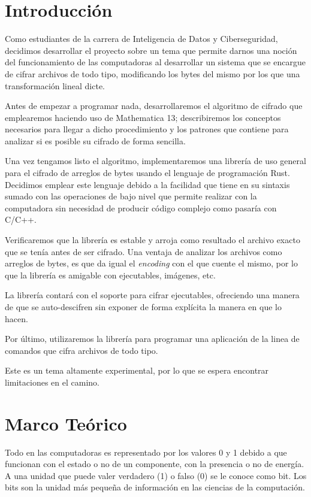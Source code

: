\documentclass[a4paper]{article}
\begin{document}
\newpage

\section{Introducción}

Como estudiantes de la carrera de Inteligencia de Datos y Ciberseguridad,
decidimos desarrollar el proyecto sobre un tema que permite darnos una noción
del funcionamiento de las computadoras al desarrollar un sistema que se
encargue de cifrar archivos de todo tipo, modificando los bytes del mismo por
los que una transformación lineal dicte.

Antes de empezar a programar nada, desarrollaremos el algoritmo de cifrado que
emplearemos haciendo uso de Mathematica 13; describiremos los conceptos
necesarios para llegar a dicho procedimiento y los patrones que contiene para
analizar si es posible su cifrado de forma sencilla.

Una vez tengamos listo el algoritmo, implementaremos una librería de uso
general para el cifrado de arreglos de bytes usando el lenguaje de programación
Rust. Decidimos emplear este lenguaje debido a la facilidad que tiene en su
sintaxis sumado con las operaciones de bajo nivel que permite realizar con la
computadora sin necesidad de producir código complejo como pasaría con
C/C++.

Verificaremos que la librería es estable y arroja como resultado el archivo
exacto que se tenía antes de ser cifrado. Una ventaja de analizar los archivos
como arreglos de bytes, es que da igual el \textit{encoding} con el que cuente
el mismo, por lo que la librería es amigable con ejecutables, imágenes, etc.

La librería contará con el soporte para cifrar ejecutables, ofreciendo una
manera de que se auto-descifren sin exponer de forma explícita la manera en que
lo hacen. 

Por último, utilizaremos la librería para programar una aplicación de la linea
de comandos que cifra archivos de todo tipo.

Este es un tema altamente experimental, por lo que se espera encontrar
limitaciones en el camino.

\newpage

\section{Marco Teórico}

Todo en las computadoras es representado por los valores 0 y 1 debido a que
funcionan con el estado o no de un componente, con la presencia o no de
energía.
A una unidad que puede valer verdadero (1) o falso (0) se le conoce como bit.
Los bits son la unidad más pequeña de información en las ciencias de la
computación.
\end{document}
